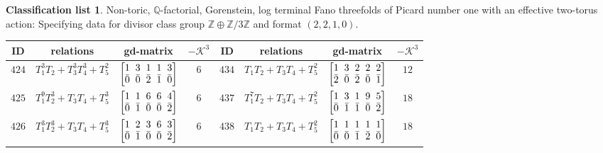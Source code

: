\documentclass[10pt,a4paper]{amsart}
\theoremstyle{definition}
\newtheorem{class-list}[thm]{Classification list}
\def\ZZ{{\mathbb Z}}
\def\QQ{{\mathbb Q}}
\numberwithin{equation}{section}
\begin{document}
\begin{class-list}\label{class-list(0,3)}
Non-toric, $\QQ$-factorial, Gorenstein, log terminal Fano
threefolds of Picard number one with an effective two-torus action:
Specifying data for divisor class group
$\ZZ\oplus \ZZ/3\ZZ$ and format $(2,2,1,0)$.
\begin{table}[h!]\centering\setlength{\tabcolsep}{3.5pt}
\renewcommand{\arraystretch}{1.15}\small\tabulinesep=1mm
\begin{tabu}{c|c|c|c||c|c|c|c}
\hline
ID&relations&gd-matrix&$-\mathcal{K}^3$&ID&relations&gd-matrix&$-\mathcal{K}^3$
\\
\hline
${424}$&${T_{1}^{3}T_{2}+T_{3}^{3}T_{4}^{3}+T_{5}^{2}}$
&$\arraycolsep=1mm\begin{bmatrix}{1} & {3} & {1} & {1} & {3} \\ {\bar{0}} & {\bar{0}} & {\bar{2}} & {\bar{1}} & {\bar{0}}\end{bmatrix}$&${6}$
&${434}$&${T_{1}T_{2}+T_{3}T_{4}+T_{5}^{2}}$
&$\arraycolsep=1mm\begin{bmatrix}{1} & {3} & {2} & {2} & {2} \\ {\bar{2}} & {\bar{0}} & {\bar{2}} & {\bar{0}} & {\bar{1}}\end{bmatrix}$&${12}$
\\
\hline
${425}$&${T_{1}^{9}T_{2}^{3}+T_{3}T_{4}+T_{5}^{3}}$
&$\arraycolsep=1mm\begin{bmatrix}{1} & {1} & {6} & {6} & {4} \\ {\bar{0}} & {\bar{1}} & {\bar{0}} & {\bar{0}} & {\bar{2}}\end{bmatrix}$&${6}$
&${437}$&${T_{1}^{7}T_{2}+T_{3}T_{4}+T_{5}^{2}}$
&$\arraycolsep=1mm\begin{bmatrix}{1} & {3} & {1} & {9} & {5} \\ {\bar{0}} & {\bar{1}} & {\bar{1}} & {\bar{0}} & {\bar{2}}\end{bmatrix}$&${18}$
\\
\hline
${426}$&${T_{1}^{3}T_{2}^{3}+T_{3}T_{4}+T_{5}^{3}}$
&$\arraycolsep=1mm\begin{bmatrix}{1} & {2} & {3} & {6} & {3} \\ {\bar{0}} & {\bar{1}} & {\bar{0}} & {\bar{0}} & {\bar{2}}\end{bmatrix}$&${6}$
&${438}$&${T_{1}T_{2}+T_{3}T_{4}+T_{5}^{2}}$
&$\arraycolsep=1mm\begin{bmatrix}{1} & {1} & {1} & {1} & {1} \\ {\bar{0}} & {\bar{0}} & {\bar{1}} & {\bar{2}} & {\bar{0}}\end{bmatrix}$&${18}$

\end{tabu}
\end{table}
\end{class-list}
\end{document}
